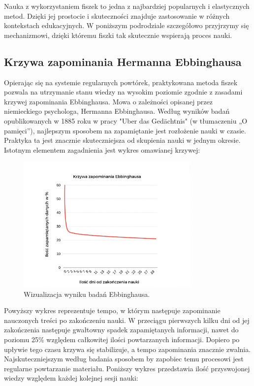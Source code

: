 Nauka z wykorzystaniem fiszek to jedna z najbardziej popularnych i elastycznych metod. Dzięki jej prostocie i skuteczności znajduje zastosowanie w różnych kontekstach edukacyjnych. W poniższym podrodziale szczegółowo przyjrzymy się mechanizmowi, dzięki któremu fiszki tak skutecznie wspierają proces nauki.


\subsection{Krzywa zapominania Hermanna Ebbinghausa}

Opierając się na systemie regularnych powtórek, praktykowana metoda fiszek pozwala na utrzymanie stanu wiedzy na wysokim poziomie zgodnie z zasadami krzywej zapominania Ebbinghausa. Mowa o zależności opisanej przez niemieckiego psychologa, Hermanna Ebbinghausa. Według wyników badań opublikowanych w 1885 roku w pracy "Uber das Gedächtnis"\cite{ebbinghausMemoryCurve}  (w tłumaczeniu „O pamięci”), najlepszym sposobem na zapamiętanie jest rozłożenie nauki w czasie. Praktyka ta jest znacznie skuteczniejsza od skupienia nauki w jednym okresie. Istotnym elementem zagadnienia jest wykres omawianej krzywej:

\begin{figure}[H]
    \centering
    \includegraphics[width=0.8\textwidth]{chapters/chapter_2/krzywa1.png}
    \caption{Wizualizacja wyniku badań Ebbinghausa.}
    \label{img:krzywa1}
\end{figure}

Powyższy wykres reprezentuje tempo, w którym następuje zapominanie nauczonych treści po zakończeniu nauki. W przeciągu pierwszych kilku dni od jej zakończenia następuje gwałtowny spadek zapamiętanych informacji, nawet do poziomu 25\% względem całkowitej ilości powtarzanych informacji. Dopiero po upływie tego czasu krzywa się stabilizuje, a tempo zapominania znacznie zwalnia. Najskuteczniejszym według badania sposobem by zapobiec temu procesowi jest regularne powtarzanie materiału. Poniższy wykres przedstawia ilość przyswojonej wiedzy względem każdej kolejnej sesji nauki:

